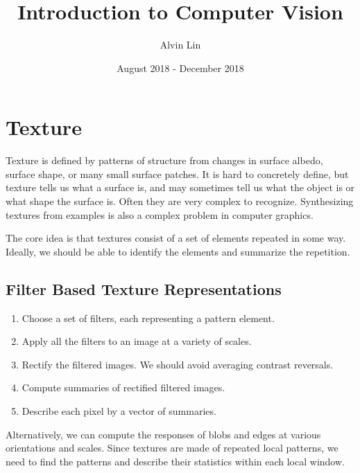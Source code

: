 \documentclass{math}
\title{Introduction to Computer Vision}
\author{Alvin Lin}
\date{August 2018 - December 2018}
\begin{document}
\maketitle

\section*{Texture}
Texture is defined by patterns of structure from changes in surface albedo,
surface shape, or many small surface patches. It is hard to concretely define,
but texture tells us what a surface is, and may sometimes tell us what the
object is or what shape the surface is. Often they are very complex to
recognize. Synthesizing textures from examples is also a complex problem in
computer graphics. \par
The core idea is that textures consist of a set of elements repeated in some
way. Ideally, we should be able to identify the elements and summarize the
repetition.

\subsection*{Filter Based Texture Representations}
\begin{enumerate}
  \item Choose a set of filters, each representing a pattern element.
  \item Apply all the filters to an image at a variety of scales.
  \item Rectify the filtered images. We should avoid averaging contrast
    reversals.
  \item Compute summaries of rectified filtered images.
  \item Describe each pixel by a vector of summaries.
\end{enumerate}
Alternatively, we can compute the responses of blobs and edges at various
orientations and scales. Since textures are made of repeated local patterns,
we need to find the patterns and describe their statistics within each local
window.
\end{document}
